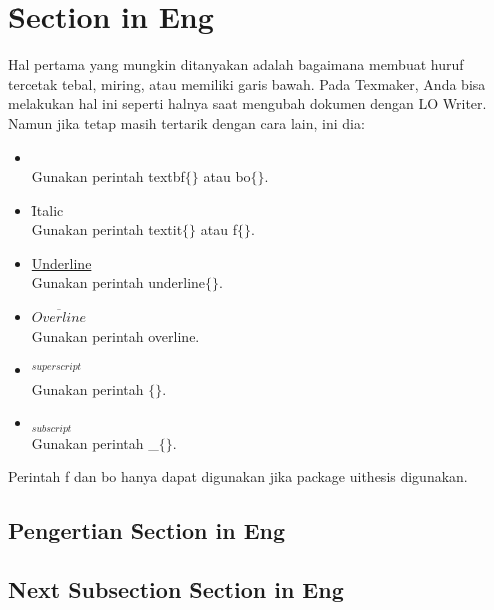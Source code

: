 \paragraph{}
\section{\f{Section in Eng}}
Hal pertama yang mungkin ditanyakan adalah bagaimana membuat huruf tercetak tebal, miring, atau memiliki garis bawah. 
Pada Texmaker, Anda bisa melakukan hal ini seperti halnya saat mengubah dokumen dengan LO Writer. 
Namun jika tetap masih tertarik dengan cara lain, ini dia: 

\begin{itemize}
	\item {} \\
		Gunakan perintah \bslash textbf$\lbrace\rbrace$ atau 
		\bslash bo$\lbrace\rbrace$. 
	\item \f{Italic} \\
		Gunakan perintah \bslash textit$\lbrace\rbrace$ atau 
		\bslash f$\lbrace\rbrace$. 
	\item \underline{Underline} \\
		Gunakan perintah \bslash underline$\lbrace\rbrace$.
	\item $\overline{Overline}$ \\
		Gunakan perintah \bslash overline. 
	\item $^{superscript}$ \\
		Gunakan perintah \bslash $\lbrace\rbrace$. 
	\item $_{subscript}$ \\
		Gunakan perintah \bslash \_$\lbrace\rbrace$. 
\end{itemize}

Perintah \bslash f dan \bslash bo hanya dapat digunakan jika package 
uithesis digunakan. 
\subsection{Pengertian \f{Section in Eng}}

\subsection{Next Subsection \f{Section in Eng}}

